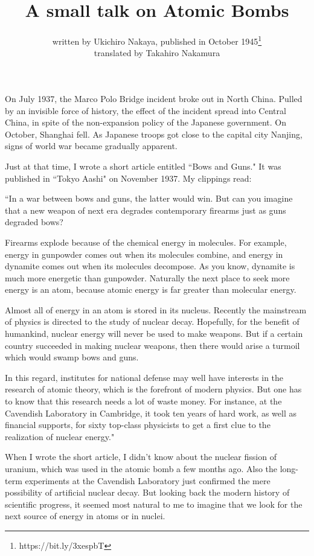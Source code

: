 \documentclass[11pt,a4j,twocolumn]{jarticle}
\title{{\small A small talk on} Atomic Bombs}
\author{written by Ukichiro Nakaya,
published in October 1945\thanks{https://bit.ly/3xespbT}\\
translated by Takahiro Nakamura
}
\date{}
\begin{document}
\baselineskip=14.6pt

\maketitle

\noindent
On July 1937, the Marco Polo Bridge incident broke out in North China.
Pulled by an invisible force of history, 
the effect of the incident spread into Central China, 
in spite of the non-expansion policy of the Japanese government.
On October, Shanghai fell. As Japanese troops got close to the capital city Nanjing,
signs of world war became gradually apparent.

Just at that time, I wrote a short article entitled ``Bows and Guns."
It was published in ``Tokyo Aashi" on November 1937.
My clippings read:

\vspace{7.3pt}\noindent
``In a war between bows and guns, the latter would win.
But can you imagine that a new weapon of next era
degrades contemporary firearms just as guns degraded bows?

Firearms explode because of the chemical energy in molecules.
For example, energy in gunpowder comes out when its molecules combine,
and energy in dynamite comes out when its molecules decompose.
As you know, dynamite is much more energetic than gunpowder.
Naturally the next place to seek more energy is an atom,
because atomic energy is far greater than molecular energy.

Almost all of energy in an atom is stored in its nucleus.
Recently the mainstream of physics is directed to the study of nuclear decay.
Hopefully, for the benefit of humankind, nuclear energy will never be used to make weapons.
But if a certain country succeeded in making nuclear weapons,
then there would arise a turmoil which would swamp bows and guns.

In this regard, institutes for national defense may well have interests in
the research of atomic theory, which is the forefront of modern physics.
But one has to know that this research needs a lot of waste money.
For instance, at the Cavendish Laboratory in Cambridge,
it took ten years of hard work, as well as financial supports,
for sixty top-class physicists to get a first clue to the realization of nuclear energy."

\vspace{7.3pt}
When I wrote the short article, I didn't know about the nuclear fission of uranium,
which was used in the atomic bomb a few months ago.
Also the long-term experiments at the Cavendish Laboratory
just confirmed the mere possibility of artificial nuclear decay.
But looking back the modern history of scientific progress,
it seemed most natural to me to imagine that we look for
the next source of energy in atoms or in nuclei.
\end{document}
